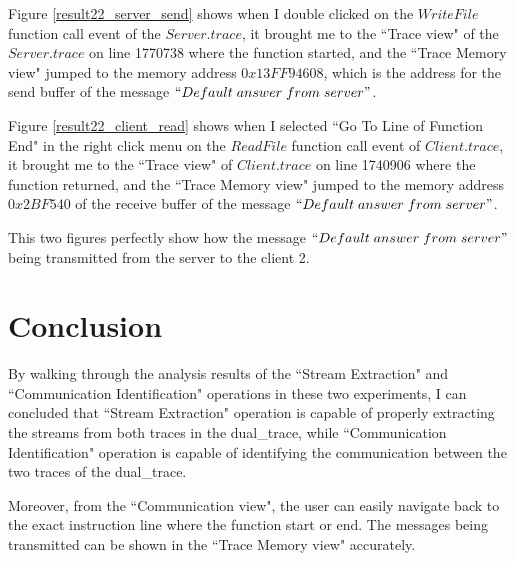 Figure \ref{result22_server_send} shows when I double clicked on the $WriteFile$ function call event of the $Server.trace$, it brought me to the ``Trace view" of the $Server.trace$ on line 1770738 where the function started, and the ``Trace Memory view" jumped to the memory address $0x13FF94608$, which is the address for the send buffer of the message $``Default\; answer\; from\; server"$.

Figure \ref{result22_client_read} shows when I selected ``Go To Line of Function End" in the right click menu on the $ReadFile$ function call event of $Client.trace$, it brought me to the ``Trace view" of $Client.trace$ on line 1740906 where the function returned, and the ``Trace Memory view" jumped to the memory address $0x2BF540$ of the receive buffer of the message $``Default\; answer\; from\; server"$.

This two figures perfectly show how the message $``Default\; answer\; from\; server"$ being transmitted from the server to the client 2.

\section{Conclusion}
By walking through the analysis results of the ``Stream Extraction" and ``Communication Identification" operations in these two experiments, I can concluded that ``Stream Extraction" operation is capable of properly extracting the streams from both traces in the dual\_trace, while ``Communication Identification" operation is capable of identifying the communication between the two traces of the dual\_trace. 

Moreover, from the ``Communication view", the user can easily navigate back to the exact instruction line where the function start or end. The messages being transmitted can be shown in the ``Trace Memory view" accurately.







   




